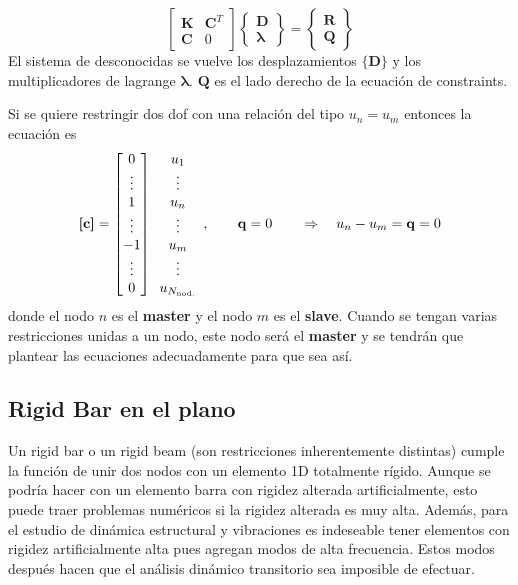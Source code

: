 \documentclass[11pt, a4paper,titlepage]{article}
\newcommand{\Mme}[1]{\boldsymbol{[}\mathbf{#1} \boldsymbol{]}}
\newcommand{\Cme}[1]{\boldsymbol{\{ }\mathbf{#1} \boldsymbol{\}} }
\newcommand{\CD}{\Cme{D}}
\begin{document}
\begin{equation}
	\begin{bmatrix}
	\mathbf{K} & \mathbf{C}^T\\
	\mathbf{C} & 0
	\end{bmatrix}
	\begin{Bmatrix}
	\mathbf{D} \\
	\pmb{\lambda}
	\end{Bmatrix}
	=
	\begin{Bmatrix}
	\mathbf{R} \\
	\mathbf{Q}
	\end{Bmatrix}
\end{equation}
El sistema de desconocidas se vuelve los desplazamientos $\CD$ y los multiplicadores de lagrange $\pmb{\lambda} $. $\mathbf{Q}$ es el lado derecho de la ecuación de constraints.

Si se quiere restringir dos dof con una relación del tipo $u_n=u_m$ entonces la ecuación es
\[
\Mme{c} = \begin{bmatrix}
0 \\ 
\vdots \\
1 \\
\vdots \\
-1 \\
\vdots \\
0
\end{bmatrix}\begin{array}{c}
u_1\\
\vdots \\
u_n \\
\vdots \\
u_m \\
\vdots \\
u_{\Nnod}
\end{array}
,
\qquad 
\mathbf{q} = 0
\qquad \Rightarrow \quad u_n-u_m = \mathbf{q} = 0
\]
donde el nodo $n$ es el \textbf{master} y el nodo $m$ es el \textbf{slave}. Cuando se tengan varias restricciones unidas a un nodo, este nodo será el \textbf{master} y se tendrán que plantear las ecuaciones adecuadamente para que sea así.

\subsection*{Rigid Bar en el plano}
Un rigid bar o un rigid beam (son restricciones inherentemente distintas) cumple la función de unir dos nodos con un elemento 1D totalmente rígido. Aunque se podría hacer con un elemento barra con rigidez alterada artificialmente, esto puede traer problemas numéricos si la rigidez alterada es muy alta. Además, para el estudio de dinámica estructural y vibraciones es indeseable tener elementos con rigidez artificialmente alta pues agregan modos de alta frecuencia. Estos modos después hacen que el análisis dinámico transitorio sea imposible de efectuar.
\end{document}
